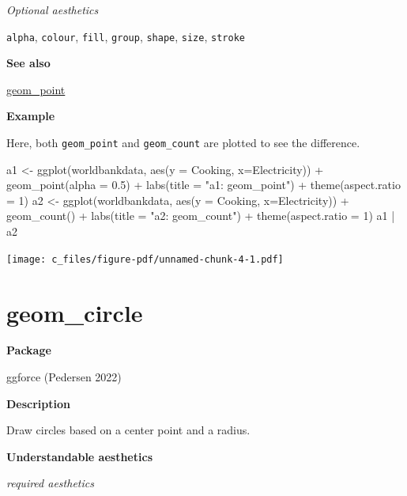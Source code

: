 \documentclass[
  letterpaper,
  DIV=11,
  numbers=noendperiod]{scrreprt}
\newenvironment{Shaded}{\begin{snugshade}}{\end{snugshade}}
\newcommand{\AttributeTok}[1]{\textcolor[rgb]{0.40,0.45,0.13}{#1}}
\newcommand{\DecValTok}[1]{\textcolor[rgb]{0.68,0.00,0.00}{#1}}
\newcommand{\FloatTok}[1]{\textcolor[rgb]{0.68,0.00,0.00}{#1}}
\newcommand{\FunctionTok}[1]{\textcolor[rgb]{0.28,0.35,0.67}{#1}}
\newcommand{\NormalTok}[1]{\textcolor[rgb]{0.00,0.23,0.31}{#1}}
\newcommand{\OtherTok}[1]{\textcolor[rgb]{0.00,0.23,0.31}{#1}}
\newcommand{\SpecialCharTok}[1]{\textcolor[rgb]{0.37,0.37,0.37}{#1}}
\newcommand{\StringTok}[1]{\textcolor[rgb]{0.13,0.47,0.30}{#1}}
\begin{document}
\emph{Optional aesthetics}

\texttt{alpha}, \texttt{colour}, \texttt{fill}, \texttt{group},
\texttt{shape}, \texttt{size}, \texttt{stroke}

\textbf{See also}

\hyperref[point]{geom\_point}

\textbf{Example}

Here, both \texttt{geom\_point} and \texttt{geom\_count} are plotted to
see the difference.

\begin{Shaded}
\begin{Highlighting}[]
\NormalTok{a1 }\OtherTok{\textless{}{-}} \FunctionTok{ggplot}\NormalTok{(worldbankdata, }\FunctionTok{aes}\NormalTok{(}\AttributeTok{y =}\NormalTok{ Cooking, }\AttributeTok{x=}\NormalTok{Electricity)) }\SpecialCharTok{+} 
  \FunctionTok{geom\_point}\NormalTok{(}\AttributeTok{alpha =} \FloatTok{0.5}\NormalTok{) }\SpecialCharTok{+} 
  \FunctionTok{labs}\NormalTok{(}\AttributeTok{title =} \StringTok{"a1: geom\_point"}\NormalTok{) }\SpecialCharTok{+}
  \FunctionTok{theme}\NormalTok{(}\AttributeTok{aspect.ratio =} \DecValTok{1}\NormalTok{)}
\NormalTok{a2 }\OtherTok{\textless{}{-}} \FunctionTok{ggplot}\NormalTok{(worldbankdata, }\FunctionTok{aes}\NormalTok{(}\AttributeTok{y =}\NormalTok{ Cooking, }\AttributeTok{x=}\NormalTok{Electricity)) }\SpecialCharTok{+} 
  \FunctionTok{geom\_count}\NormalTok{() }\SpecialCharTok{+} 
  \FunctionTok{labs}\NormalTok{(}\AttributeTok{title =} \StringTok{"a2: geom\_count"}\NormalTok{) }\SpecialCharTok{+}
  \FunctionTok{theme}\NormalTok{(}\AttributeTok{aspect.ratio =} \DecValTok{1}\NormalTok{)}
\NormalTok{a1 }\SpecialCharTok{|}\NormalTok{ a2}
\end{Highlighting}
\end{Shaded}

\texttt{[image: c\_files/figure-pdf/unnamed-chunk-4-1.pdf]}

\section{geom\_circle}\label{circle}

\textbf{Package}

ggforce (Pedersen 2022)

\textbf{Description}

Draw circles based on a center point and a radius.

\textbf{Understandable aesthetics}

\emph{required aesthetics}
\end{document}
